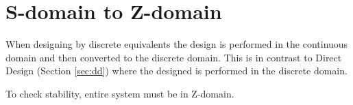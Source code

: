 \documentclass{article}
\newcommand{\sincludepdf}[2][]{
	
}
\begin{document}
\section{S-domain to Z-domain}

When designing by discrete equivalents the design is performed
in the continuous domain and then converted to the discrete domain.
This is in contrast to Direct Design (Section \ref{sec:dd}) where
the designed is performed in the discrete domain.

To check stability, entire system must be in Z-domain.

\sincludepdf[pages={10},
			pagecommand=\subsection{Mapping: $z=e^{sT}$}\subsection*{Example 1}
		]{scan/11221301.pdf}

\sincludepdf[pages={1},
			pagecommand=\subsubsection*{Example 2}
	]{scan/11231301.pdf}

\sincludepdf[pages={9},
			pagecommand=\subsection{Mapping: Forward, Backward, Trapezoid}\subsubsection*{Example 1}
	]{scan/11211301.pdf}

\sincludepdf[pages={10},
			pagecommand=\subsubsection*{Example 2}
	]{scan/11211301.pdf}

\sincludepdf[pages={8},
			pagecommand=\subsubsection*{Example 3}
		]{scan/11221301.pdf}
\end{document}
